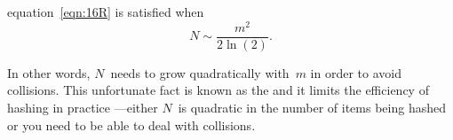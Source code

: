 equation~\eqref{eqn:16R} is satisfied when
\begin{equation}\label{eqn:16S}
    N \sim \frac{m^2}{2 \ln(2)}.
\end{equation}

In other words, $N$~needs to grow quadratically with~$m$ in order to
avoid collisions.  This unfortunate fact is known as the
 and it limits the efficiency of hashing in
practice ---either $N$~is quadratic in the number of items being hashed
or you need to be able to deal with collisions.

\fi

\endinput
